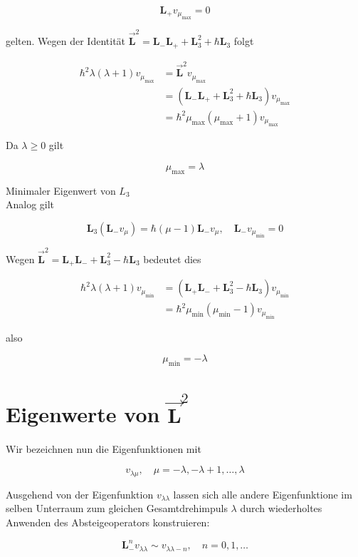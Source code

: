\documentclass[10pt, letterpaper]{article}
\begin{document}
$$
\mathbf{L}_{+} v_{\mu_{\max }}=0
$$

gelten. Wegen der Identität $\overrightarrow{\mathbf{L}}^{2}=\mathbf{L}_{-} \mathbf{L}_{+}+\mathbf{L}_{3}^{2}+\hbar \mathbf{L}_{3}$ folgt

$$
\begin{aligned}
\hbar^{2} \lambda(\lambda+1) v_{\mu_{\max }} & =\overrightarrow{\mathbf{L}}^{2} v_{\mu_{\max }} \\
& =\left(\mathbf{L}_{-} \mathbf{L}_{+}+\mathbf{L}_{3}^{2}+\hbar \mathbf{L}_{3}\right) v_{\mu_{\max }} \\
& =\hbar^{2} \mu_{\max }\left(\mu_{\max }+1\right) v_{\mu_{\max }}
\end{aligned}
$$

Da $\lambda \geq 0$ gilt

$$
\mu_{\max }=\lambda
$$

Minimaler Eigenwert von $L_{3}$\\
Analog gilt

$$
\mathbf{L}_{3}\left(\mathbf{L}_{-} v_{\mu}\right)=\hbar(\mu-1) \mathbf{L}_{-} v_{\mu}, \quad \mathbf{L}_{-} v_{\mu_{\min }}=0
$$

Wegen $\overrightarrow{\mathbf{L}}^{2}=\mathbf{L}_{+} \mathbf{L}_{-}+\mathbf{L}_{3}^{2}-\hbar \mathbf{L}_{3}$ bedeutet dies

$$
\begin{aligned}
\hbar^{2} \lambda(\lambda+1) v_{\mu_{\min }} & =\left(\mathbf{L}_{+} \mathbf{L}_{-}+\mathbf{L}_{3}^{2}-\hbar \mathbf{L}_{3}\right) v_{\mu_{\min }} \\
& =\hbar^{2} \mu_{\min }\left(\mu_{\min }-1\right) v_{\mu_{\min }}
\end{aligned}
$$

also

$$
\mu_{\min }=-\lambda
$$

\section*{Eigenwerte von $\overrightarrow{\mathbf{L}}^{2}$}
Wir bezeichnen nun die Eigenfunktionen mit

$$
v_{\lambda \mu}, \quad \mu=-\lambda,-\lambda+1, \ldots, \lambda
$$

Ausgehend von der Eigenfunktion $v_{\lambda \lambda}$ lassen sich alle andere Eigenfunktione im selben Unterraum zum gleichen Gesamtdrehimpuls $\lambda$ durch wiederholtes Anwenden des Absteigeoperators konstruieren:

$$
\mathbf{L}_{-}^{n} v_{\lambda \lambda} \sim v_{\lambda \lambda-n}, \quad n=0,1, \ldots
$$
\end{document}
